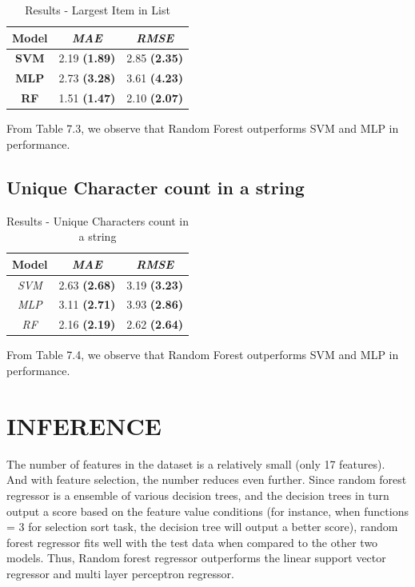 \begin{table}[h]  
\centering
\caption{Results - Largest Item in List}
\begin{tabular}{|c|c|c|}
\hline
\textbf{Model} & \textit{\textbf{MAE}} & \textit{\textbf{RMSE}} \\ \hline
\textbf{SVM}   & 2.19 \textbf{(1.89)}           & 2.85 \textbf{(2.35)}            \\ \hline
\textbf{MLP}   & 2.73 \textbf{(3.28)}           & 3.61 \textbf{(4.23) }           \\ \hline
\textbf{RF}    & 1.51 \textbf{(1.47)}           & 2.10 \textbf{(2.07)}            \\ \hline
\end{tabular}

\label{tab:larg-list}
\end{table}

From Table 7.3, we observe that Random Forest outperforms SVM and MLP in performance. 


\subsection{Unique Character count in a string}

\begin{table}[h]
\centering
\caption{Results - Unique Characters count in a string}
\begin{tabular}{|c|c|c|}
\hline
\textbf{Model} & \textit{\textbf{MAE}} & \textit{\textbf{RMSE}} \\ \hline
\textit{SVM} & 2.63 \textbf{(2.68)} & 3.19 \textbf{(3.23)} \\ \hline
\textit{MLP} & 3.11 \textbf{(2.71)} & 3.93 \textbf{(2.86)} \\ \hline
\textit{RF} & 2.16 \textbf{(2.19)} & 2.62 \textbf{(2.64)} \\ \hline
\end{tabular}

\label{tab:unique}
\end{table}

From Table 7.4, we observe that Random Forest outperforms SVM and MLP in performance. 

\section{INFERENCE}

The number of features in the dataset is a relatively small (only 17
features). And with feature selection, the number reduces even
further. Since random forest regressor is a ensemble of various
decision trees, and the decision trees in turn output a score based on
the feature value conditions (for instance, when functions = 3 for
selection sort task, the decision tree will output a better score),
random forest regressor fits well with the test data when compared to
the other two models. Thus, Random forest regressor outperforms the
linear support vector regressor and multi layer perceptron regressor.

